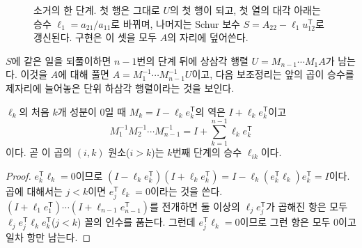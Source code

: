 \begin{figure}[t]
\centering
{}
\caption{소거의 한 단계. 첫 행은 그대로 $U$의 첫 행이 되고, 첫 열의 대각 아래는 승수 $\ell_1=a_{21}/a_{11}$로 바뀌며, 나머지는 Schur 보수 $S=A_{22}-\ell_1u_{12}^{\mathsf T}$로 갱신된다. 구현은 이 셋을 모두 $A$의 자리에 덮어쓴다.}
\label{fig:lu-step}
\end{figure}

$S$에 같은 일을 되풀이하면 $n-1$번의 단계 뒤에 상삼각 행렬 $U=M_{n-1}\cdots M_1A$가 남는다. 이것을 $A$에 대해 풀면 $A=M_1^{-1}\cdots M_{n-1}^{-1}U$이고, 다음 보조정리는 앞의 곱이 승수를 제자리에 늘어놓은 단위 하삼각 행렬이라는 것을 보인다.

\begin{lemma}
\label{lem:lu-multipliers}
$\ell_k$의 처음 $k$개 성분이 $0$일 때 $M_k=I-\ell_ke_k^{\mathsf T}$의 역은 $I+\ell_ke_k^{\mathsf T}$이고
\[
M_1^{-1}M_2^{-1}\cdots M_{n-1}^{-1}=I+\sum_{k=1}^{n-1}\ell_ke_k^{\mathsf T}
\]
이다. 곧 이 곱의 $(i,k)$ 원소($i>k$)는 $k$번째 단계의 승수 $\ell_{ik}$이다.
\end{lemma}

\begin{proof}
$e_k^{\mathsf T}\ell_k=0$이므로 $(I-\ell_ke_k^{\mathsf T})(I+\ell_ke_k^{\mathsf T})=I-\ell_k(e_k^{\mathsf T}\ell_k)e_k^{\mathsf T}=I$이다. 곱에 대해서는 $j<k$이면 $e_j^{\mathsf T}\ell_k=0$이라는 것을 쓴다. $(I+\ell_1e_1^{\mathsf T})\cdots(I+\ell_{n-1}e_{n-1}^{\mathsf T})$를 전개하면 둘 이상의 $\ell_je_j^{\mathsf T}$가 곱해진 항은 모두 $\ell_{j}e_{j}^{\mathsf T}\ell_{k}e_k^{\mathsf T}$($j<k$) 꼴의 인수를 품는다. 그런데 $e_j^{\mathsf T}\ell_k=0$이므로 그런 항은 모두 $0$이고 일차 항만 남는다.
\end{proof}

